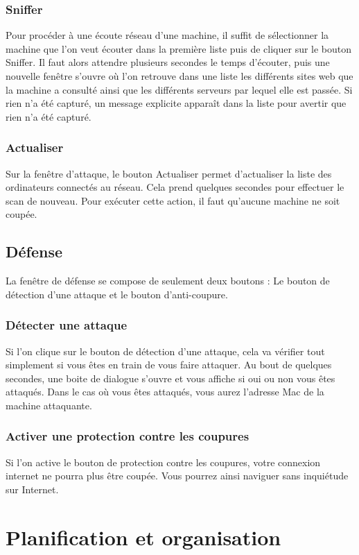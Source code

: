 \documentclass[11pt]{article}
\begin{document}
\subsubsection{Sniffer}
Pour procéder à une écoute réseau d'une machine, il suffit de sélectionner la machine que l'on veut écouter dans la première liste puis de cliquer sur le bouton Sniffer. Il faut alors attendre plusieurs secondes le temps d'écouter, puis une nouvelle fenêtre s'ouvre où l'on retrouve dans une liste les différents sites web que la machine a consulté ainsi que les différents serveurs par lequel elle est passée. Si rien n'a été capturé, un message explicite apparaît dans la liste pour avertir que rien n'a été capturé.

\subsubsection{Actualiser}
Sur la fenêtre d'attaque, le bouton Actualiser permet d'actualiser la liste des ordinateurs connectés au réseau. Cela prend quelques secondes pour effectuer le scan de nouveau. Pour exécuter cette action, il faut qu'aucune machine ne soit coupée.

\subsection{Défense}
La fenêtre de défense se compose de seulement deux boutons : Le bouton de détection d'une attaque et le bouton d'anti-coupure.

\subsubsection{Détecter une attaque}
Si l'on clique sur le bouton de détection d'une attaque, cela va vérifier tout simplement si vous êtes en train de vous faire attaquer. Au bout de quelques secondes, une boite de dialogue s'ouvre et vous affiche si oui ou non vous êtes attaqués. Dans le cas où vous êtes attaqués, vous aurez l'adresse Mac de la machine attaquante.

\subsubsection{Activer une protection contre les coupures}
Si l'on active le bouton de protection contre les coupures, votre connexion internet ne pourra plus être coupée. Vous pourrez ainsi naviguer sans inquiétude sur Internet.

\section{Planification et organisation}
\end{document}
